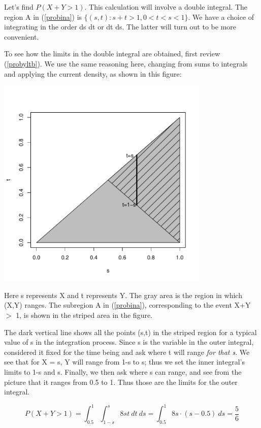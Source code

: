 Let's find $P(X+Y > 1)$.  This calculation will involve a double
integral.  The region A in (\ref{probina}) is $\{(s,t): s+t > 1, 0 < t <
s < 1\}$.  We have a choice of integrating in the order ds dt or dt ds.
The latter will turn out to be more convenient.

To see how the limits in the double integral are obtained, first review
(\ref{probyltb}).  We use the same reasoning here, changing from sums to
integrals and applying the current density, as shown in this figure:

\includegraphics[width=4in]{DoubleInt.pdf}


Here s represents X and t represents Y.  The gray area is the region in
which (X,Y) ranges.  The subregion A in (\ref{probina}), corresponding
to the event X+Y $>$ 1, is shown in the striped area in the figure.

The dark vertical line shows all the points (s,t) in the striped region
for a typical value of s in the integration process.  Since s is the
variable in the outer integral, considered it fixed for the time being
and ask where t will range {\it for that s}.  We see that for X = s, Y
will range from 1-s to s; thus we set the inner integral's limits to 1-s
and s.  Finally, we then ask where s can range, and see from the picture
that it ranges from 0.5 to 1.  Thus those are the limits for the outer
integral.

\begin{equation}
\label{xygt1}
P(X+Y > 1) = \int_{0.5}^{1} \int_{1-s}^{s} 8st ~ dt ~ ds
= \int_{0.5}^{1} 8s \cdot (s-0.5) ~ ds = \frac{5}{6}
\end{equation}

